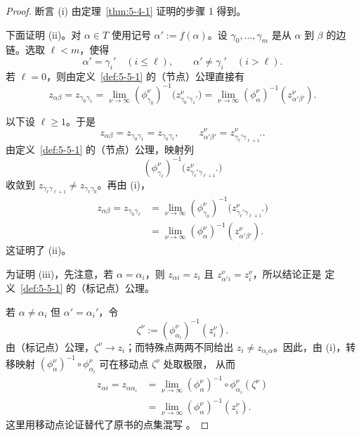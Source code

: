 \begin{proof}
断言 (i) 由定理~\ref{thm:5-4-1} 证明的步骤 1 得到。

下面证明 (ii)。对 $\alpha\in T$ 使用记号 $\alpha':=f(\alpha)$。设
$\gamma_0,\ldots,\gamma_m$ 是从 $\alpha$ 到 $\beta$ 的边链。选取 $\ell<m$，使得
\[
  \alpha'=\gamma_i'\quad(i\le\ell),
  \qquad
  \alpha'\ne\gamma_i'\quad(i>\ell).
\]
若 $\ell=0$，则由定义~\ref{def:5-5-1} 的（节点）公理直接有
\[
  z_{\alpha\beta}=z_{\gamma_0\gamma_1}
  =\lim_{\nu\to\infty}
    (\phi_{\gamma_0}^\nu)^{-1}
    \bigl(z_{\gamma_0'\gamma_1'}^\nu\bigr)
  =\lim_{\nu\to\infty}
    (\phi_\alpha^\nu)^{-1}(z_{\alpha'\beta'}^\nu).
\]

以下设 $\ell\ge1$。于是
\[
  z_{\alpha\beta}=z_{\gamma_0\gamma_1}=z_{\gamma_0\gamma_\ell},
  \qquad
  z_{\alpha'\beta'}^\nu
  =z_{\gamma_\ell'\gamma_{\ell+1}'}^\nu.
\]
由定义~\ref{def:5-5-1} 的（节点）公理，映射列
\[
  (\phi_{\gamma_\ell}^\nu)^{-1}
  \bigl(z_{\gamma_\ell'\gamma_{\ell+1}'}^\nu\bigr)
\]
收敛到
$z_{\gamma_\ell\gamma_{\ell+1}}\ne z_{\gamma_\ell\gamma_0}$。再由 (i)，
\[
  \begin{aligned}
  z_{\alpha\beta}=z_{\gamma_0\gamma_\ell}
  &=\lim_{\nu\to\infty}
    (\phi_{\gamma_0}^\nu)^{-1}
    \bigl(z_{\gamma_\ell'\gamma_{\ell+1}'}^\nu\bigr)\\
  &=\lim_{\nu\to\infty}
    (\phi_\alpha^\nu)^{-1}(z_{\alpha'\beta'}^\nu).
  \end{aligned}
\]
这证明了 (ii)。

为证明 (iii)，先注意，若 $\alpha=\alpha_i$，则
$z_{\alpha i}=z_i$ 且 $z_{\alpha'i}^\nu=z_i^\nu$，所以结论正是
定义~\ref{def:5-5-1} 的（标记点）公理。

若 $\alpha\ne\alpha_i$ 但 $\alpha'=\alpha_i'$，令
\[
  \zeta^\nu:=(\phi_{\alpha_i}^\nu)^{-1}(z_i^\nu).
\]
由（标记点）公理，$\zeta^\nu\to z_i$；而特殊点两两不同给出
$z_i\ne z_{\alpha_i\alpha}$。因此，由 (i)，转移映射
$(\phi_\alpha^\nu)^{-1}\circ\phi_{\alpha_i}^\nu$ 可在移动点 $\zeta^\nu$ 处取极限，
从而
\[
  \begin{aligned}
  z_{\alpha i}=z_{\alpha\alpha_i}
  &=\lim_{\nu\to\infty}
    (\phi_\alpha^\nu)^{-1}\circ\phi_{\alpha_i}^\nu(\zeta^\nu)\\
  &=\lim_{\nu\to\infty}(\phi_\alpha^\nu)^{-1}(z_i^\nu).
  \end{aligned}
\]
这里用移动点论证替代了原书的点集混写
。


\end{proof}
